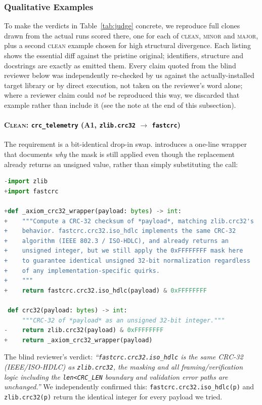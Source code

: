 \subsubsection{Qualitative Examples}
\label{sec:qualitative}

To make the verdicts in Table~\ref{tab:judge} concrete, we reproduce full \sys clones drawn from the actual runs scored there, one for each of \textsc{clean}, \textsc{minor} and \textsc{major}, plus a second \textsc{clean} example chosen for high structural divergence. Each listing shows the essential diff against the pristine original; identifiers, structure and docstrings are exactly as \sys emitted them. Every claim quoted from the blind reviewer below was independently re-checked by us against the actually-installed target library or by direct execution, not taken on the reviewer's word alone; where a reviewer claim could \emph{not} be reproduced this way, we discarded that example rather than include it (see the note at the end of this subsection).

\paragraph{\textsc{Clean}: \texttt{crc\_telemetry} (A1, \texttt{zlib.crc32} $\rightarrow$ \texttt{fastcrc})}
The requirement is a bit-identical drop-in swap. \sys introduces a one-line wrapper that documents \emph{why} the mask is still applied even though the replacement already returns an unsigned value, rather than simply substituting the call:

\begin{lstlisting}[language=Python, basicstyle=\ttfamily\scriptsize, breaklines=true, frame=single]
-import zlib
+import fastcrc

+def _axiom_crc32_wrapper(payload: bytes) -> int:
+    """Compute a CRC-32 checksum of *payload*, matching zlib.crc32's
+    behavior. fastcrc.crc32.iso_hdlc implements the same CRC-32
+    algorithm (IEEE 802.3 / ISO-HDLC), and already returns an
+    unsigned integer, but we still apply the 0xFFFFFFFF mask here
+    to guarantee identical unsigned 32-bit normalization regardless
+    of any implementation-specific quirks.
+    """
+    return fastcrc.crc32.iso_hdlc(payload) & 0xFFFFFFFF

 def crc32(payload: bytes) -> int:
     """CRC-32 of *payload* as an unsigned 32-bit integer."""
-    return zlib.crc32(payload) & 0xFFFFFFFF
+    return _axiom_crc32_wrapper(payload)
\end{lstlisting}
The blind reviewer's verdict: \emph{``\texttt{fastcrc.crc32.iso\_hdlc} is the same CRC-32 (IEEE/ISO-HDLC) as \texttt{zlib.crc32}, the masking and all framing/verification logic including the \texttt{len<CRC\_LEN} boundary and validation error paths are unchanged.''} We independently confirmed this: \texttt{fastcrc.crc32.iso\_hdlc(p)} and \texttt{zlib.crc32(p)} return the identical integer for every payload we tried.


